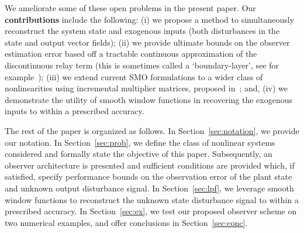 \documentclass[times, doublespace]{rncauth}
\newcommand\ignore[1]{{}}
\begin{document}
We ameliorate some of these open problems in the present paper. Our \textbf{contributions} include the following: (i) we propose a method to simultaneously reconstruct the system state and exogenous inputs (both disturbances in the state and output vector fields); (ii) we provide ultimate bounds on the observer estimation error based off a tractable continuous approximation of the discontinuous relay term (this is sometimes called a `boundary-layer', see for example~\cite{Chouinard1985, Barmish1983, Corless1981, Zak_txtbk}); (iii) we extend current SMO formulations to a wider class of nonlinearities using incremental multiplier matrices, proposed in~\cite{iqs_corless}; and, (iv) we demonstrate the utility of smooth window functions in recovering the exogenous inputs to within a prescribed accuracy.

The rest of the paper is organized as follows. In Section~\ref{sec:notation}, we provide our notation. In Section~\ref{sec:prob}, we define the class of nonlinear systems considered and formally state the objective of this paper. Subsequently, an observer architecture is presented and sufficient conditions are provided which, if satisfied, specify performance bounds on the observation error of the plant state and unknown output disturbance signal. In Section~\ref{sec:lpf}, we leverage smooth window functions to reconstruct the unknown state disturbance signal to within a prescribed accuracy. In Section~\ref{sec:ex}, we test our proposed observer scheme on two numerical examples, and offer conclusions in Section~\ref{sec:conc}.

\ignore{}
\end{document}
